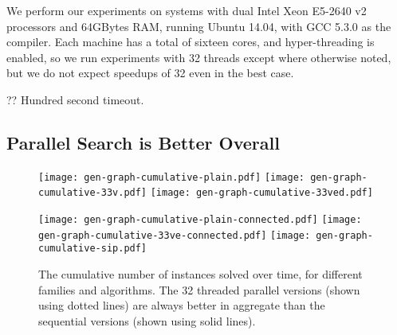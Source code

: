 \documentclass[sigconf]{acmart}
\begin{document}
We perform our experiments on systems with dual Intel Xeon E5-2640 v2 processors and 64GBytes RAM,
running Ubuntu 14.04, with GCC 5.3.0 as the compiler. Each machine has a total of sixteen cores, and
hyper-threading is enabled, so we run experiments with 32 threads except where otherwise noted, but
we do not expect speedups of 32 even in the best case.

?? Hundred second timeout.

\subsection{Parallel Search is Better Overall}

\begin{figure*}[p]
    \texttt{[image: gen-graph-cumulative-plain.pdf]}
    \hfill
    \texttt{[image: gen-graph-cumulative-33v.pdf]}
    \hfill
    \texttt{[image: gen-graph-cumulative-33ved.pdf]}

    \vspace*{1em}

    \texttt{[image: gen-graph-cumulative-plain-connected.pdf]}
    \hfill
    \texttt{[image: gen-graph-cumulative-33ve-connected.pdf]}
    \hfill
    \texttt{[image: gen-graph-cumulative-sip.pdf]}

    \caption{The cumulative number of instances solved over time, for different families and
    algorithms. The 32 threaded parallel versions (shown using dotted lines) are always better in
aggregate than the sequential versions (shown using solid lines).}\label{figure:cumulative}
\end{figure*}
\end{document}
